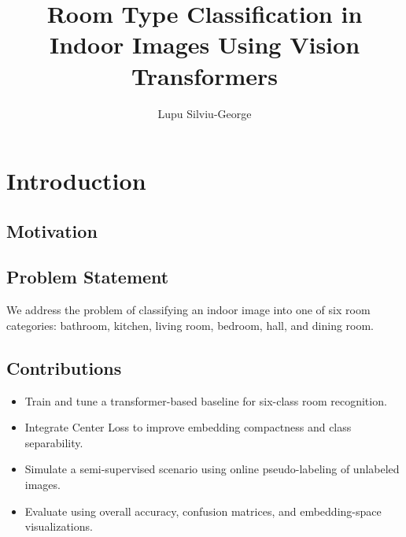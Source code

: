 \documentclass[12pt, a4paper, oneside]{teza-upb_en}
\begin{document}
\author{Lupu Silviu-George}

\title{Room Type Classification in Indoor Images Using Vision Transformers}



\beforepreface
\listoffigures
\listoftables
{}
\afterpreface

\chapter{Introduction}
\section{Motivation}

\section{Problem Statement}
We address the problem of classifying an indoor image into one of six room categories:
bathroom, kitchen, living room, bedroom, hall, and dining room.

\section{Contributions}
\begin{itemize}
  \item Train and tune a transformer-based baseline for six-class room recognition.
  \item Integrate Center Loss to improve embedding compactness and class separability.
  \item Simulate a semi-supervised scenario using online pseudo-labeling of unlabeled images.
  \item Evaluate using overall accuracy, confusion matrices, and embedding-space visualizations.
\end{itemize}
\end{document}
